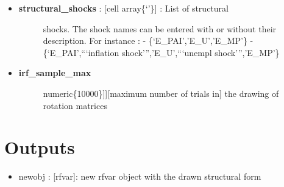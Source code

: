 \documentclass[letterpaper,10pt,english]{sphinxmanual}
\begin{document}
\begin{itemize}
\begin{itemize}
\begin{description}
\end{description}

\item {} \begin{description}
\item[{\textbf{structural\_shocks} : {[}cell array\textbar{}\{`'\}{]} : List of structural}] \leavevmode
shocks. The shock names can be entered with or without their
description. For instance :
- \{`E\_PAI','E\_U','E\_MP'\}
- \{`E\_PAI',```inflation shock''','E\_U',```unempl shock''','E\_MP'\}

\end{description}

\item {} \begin{description}
\item[{\textbf{irf\_sample\_max}}] \leavevmode{[}{[}numeric\textbar{}\{10000\}{]}{]}{[}maximum number of trials in{]}
the drawing of rotation matrices

\end{description}

\end{itemize}

\end{itemize}


\section{Outputs}
\label{classes/models/@rfvar/rfvar:id145}\begin{itemize}
\item {} 
newobj : {[}rfvar{]}: new rfvar object with the drawn structural form

\end{itemize}
\end{document}
